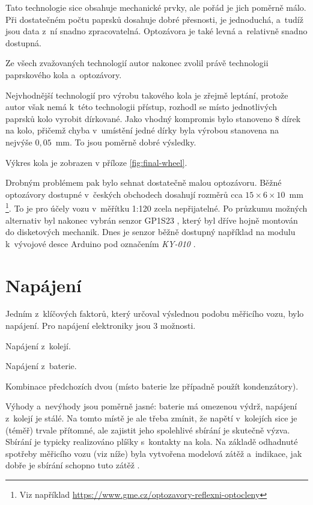 Tato technologie sice obsahuje mechanické prvky, ale pořád je jich poměrně
málo. Při dostatečném počtu paprsků dosahuje dobré přesnosti, je jednoduchá,
a~tudíž jsou data z~ní snadno zpracovatelná. Optozávora je také levná a~relativně
snadno dostupná.

Ze všech zvažovaných technologií autor nakonec zvolil právě technologii
paprskového kola a~optozávory.

Nejvhodnější technologií pro výrobu takového kola je zřejmě leptání, protože
autor však nemá k~této technologii přístup, rozhodl se místo jednotlivých
paprsků kolo vyrobit dírkované. Jako vhodný kompromis bylo stanoveno
8 dírek na kolo, přičemž chyba v~umístění jedné dírky byla výrobou stanovena na
nejvýše $0,05$~mm. To jsou poměrně dobré výsledky.

Výkres kola je zobrazen v příloze \ref{fig:final-wheel}.

Drobným problémem pak bylo sehnat dostatečně malou optozávoru. Běžné optozávory
dostupné v~českých obchodech dosahují rozměrů cca $15\times6\times10$~mm
\footnote{Viz například
\url{https://www.gme.cz/optozavory-reflexni-optocleny}}. To je pro účely vozu
v~měřítku 1:120 zcela nepřijatelné. Po
průzkumu možných alternativ byl nakonec vybrán senzor
GP1S23 \cite{gp1s23:datasheet}, který byl dříve hojně montován do disketových
mechanik. Dnes je senzor běžně dostupný například na modulu k~vývojové desce
Arduino pod označením \textit{KY-010} \cite{ky-010}.

\section{Napájení}
\label{sec:wsm-napajeni}

Jedním z~klíčových faktorů, který určoval výslednou podobu měřicího vozu, bylo
napájení. Pro napájení elektroniky jsou 3 možnosti.

\begin{compactenum}
\item Napájení z~kolejí.
\item Napájení z~baterie.
\item Kombinace předchozích dvou (místo baterie lze případně použít kondenzátory).
\end{compactenum}

Výhody a~nevýhody jsou poměrně jasné: baterie má omezenou výdrž, napájení
z~kolejí je stálé. Na tomto místě je ale třeba zmínit, že napětí v~kolejích
sice je (téměř) trvale přítomné, ale zajistit jeho spolehlivé sbírání je
skutečně výzva. Sbírání je typicky realizováno plíšky s~kontakty na kola.
Na základě odhadnuté spotřeby měřicího vozu (viz níže) byla vytvořena modelová
zátěž a~indikace, jak dobře je sbírání schopno tuto zátěž .


